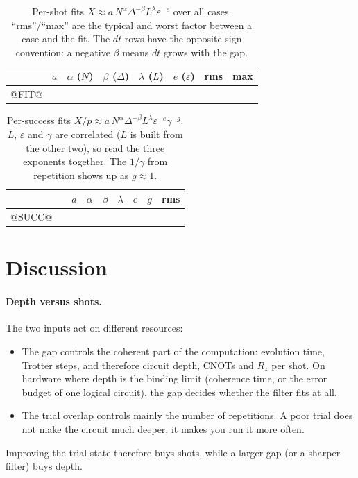 \documentclass[10pt]{article}
\begin{document}
\begin{table}[h]\centering\small
\caption{Per-shot fits $X\approx a\,N^{\alpha}\Delta^{-\beta}L^{\lambda}\varepsilon^{-e}$ over all cases.
``rms''/``max'' are the typical and worst factor between a case and the fit. The $dt$ rows have the opposite
sign convention: a negative $\beta$ means $dt$ grows with the gap.}\label{tab:fit}
\begin{tabular}{lccccccc}\toprule
 & $a$ & $\alpha$ ($N$) & $\beta$ ($\Delta$) & $\lambda$ ($L$) & $e$ ($\varepsilon$) & rms & max \\\midrule
@FIT@
\bottomrule\end{tabular}
\end{table}

\begin{table}[h]\centering\small
\caption{Per-success fits $X/p\approx a\,N^{\alpha}\Delta^{-\beta}L^{\lambda}\varepsilon^{-e}\gamma^{-g}$. $L$, $\varepsilon$
and $\gamma$ are correlated ($L$ is built from the other two), so read the three exponents together. The $1/\gamma$
from repetition shows up as $g\approx1$.}\label{tab:succ}
\begin{tabular}{llccccccc}\toprule
 & & $a$ & $\alpha$ & $\beta$ & $\lambda$ & $e$ & $g$ & rms \\\midrule
@SUCC@
\bottomrule\end{tabular}
\end{table}

\section{Discussion}

\paragraph{Depth versus shots.} The two inputs act on different resources:
\begin{itemize}
\item The gap controls the coherent part of the computation: evolution time, Trotter steps, and therefore circuit
depth, CNOTs and $R_z$ per shot. On hardware where depth is the binding limit (coherence time, or the error budget
of one logical circuit), the gap decides whether the filter fits at all.
\item The trial overlap controls mainly the number of repetitions. A poor trial does not make the circuit much
deeper, it makes you run it more often.
\end{itemize}
Improving the trial state therefore buys shots, while a larger gap (or a sharper filter) buys depth.
\end{document}
